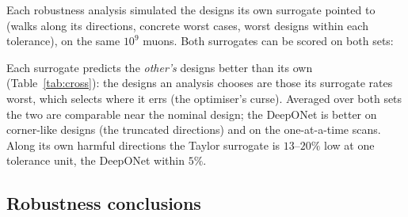 \documentclass[11pt,a4paper]{article}
\begin{document}
Each robustness analysis simulated the designs its own surrogate pointed to (walks along its
directions, concrete worst cases, worst designs within each tolerance), on the same $10^9$ muons.
Both surrogates can be scored on both sets:

\begin{table}[h]
\centering
\caption{Median $|\log(\text{pred}/\text{sim})|$ of each surrogate on the designs simulated in each
analysis. The scans are the same designs in both.}
\label{tab:cross}
\end{table}

Each surrogate predicts the \emph{other's} designs better than its own (Table~\ref{tab:cross}): the
designs an analysis chooses are those its surrogate rates worst, which selects where it errs (the
optimiser's curse). Averaged over both sets the two are comparable near the nominal design; the
DeepONet is better on corner-like designs (the truncated directions) and on the one-at-a-time
scans. Along its own harmful directions the Taylor surrogate is $13$--$20\%$ low at one tolerance
unit, the DeepONet within $5\%$.

\subsection{Robustness conclusions}
\end{document}

